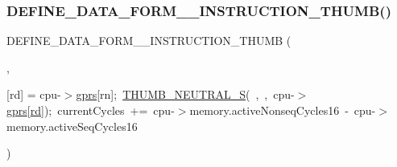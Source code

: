 \subsubsection{\texorpdfstring{D\+E\+F\+I\+N\+E\+\_\+\+D\+A\+T\+A\+\_\+\+F\+O\+R\+M\+\_\+\_\+\+I\+N\+S\+T\+R\+U\+C\+T\+I\+O\+N\+\_\+\+T\+H\+U\+M\+B()}{DEFINE\_DATA\_FORM\_5\_INSTRUCTION\_THUMB()}\hspace{0.1cm}{\footnotesize\ttfamily [2/2]}}
{\footnotesize\ttfamily D\+E\+F\+I\+N\+E\+\_\+\+D\+A\+T\+A\+\_\+\+F\+O\+R\+M\+\_\+\_\+\+I\+N\+S\+T\+R\+U\+C\+T\+I\+O\+N\+\_\+\+T\+H\+U\+MB (\begin{DoxyParamCaption}\item[{M\+UL}]{,  }\item[{A\+R\+M\+\_\+\+W\+A\+I\+T\+\_\+\+M\+UL(cpu-\/$>$\mbox{\hyperlink{isa-thumb_8c_a6b4b7e13a9a144391615b217c5917bc7}{gprs}}\mbox{[}\mbox{\hyperlink{isa-arm_8c_a555541ce18ed9b5fad657a06b22cb465}{rd}}\mbox{]});cpu-\/$>$\mbox{\hyperlink{isa-thumb_8c_a6b4b7e13a9a144391615b217c5917bc7}{gprs}} $\ast$}]{\mbox{[}rd\mbox{]} = {\ttfamily cpu-\/$>$\mbox{\hyperlink{isa-thumb_8c_a6b4b7e13a9a144391615b217c5917bc7}{gprs}}\mbox{[}rn\mbox{]};~\mbox{\hyperlink{isa-thumb_8c_a6f5c37aae89e9b8c791d4bf7625e6774}{T\+H\+U\+M\+B\+\_\+\+N\+E\+U\+T\+R\+A\+L\+\_\+S}}(~,~,~cpu-\/$>$\mbox{\hyperlink{isa-thumb_8c_a6b4b7e13a9a144391615b217c5917bc7}{gprs}}\mbox{[}\mbox{\hyperlink{isa-arm_8c_a555541ce18ed9b5fad657a06b22cb465}{rd}}\mbox{]});~currentCycles~+=~cpu-\/$>$memory.activeNonseqCycles16~-\/~cpu-\/$>$memory.activeSeqCycles16} }\end{DoxyParamCaption})}

\mbox{\label{isa-thumb_8c_a89d223e8bbf16381ad3a5f8748f926ac}} 
